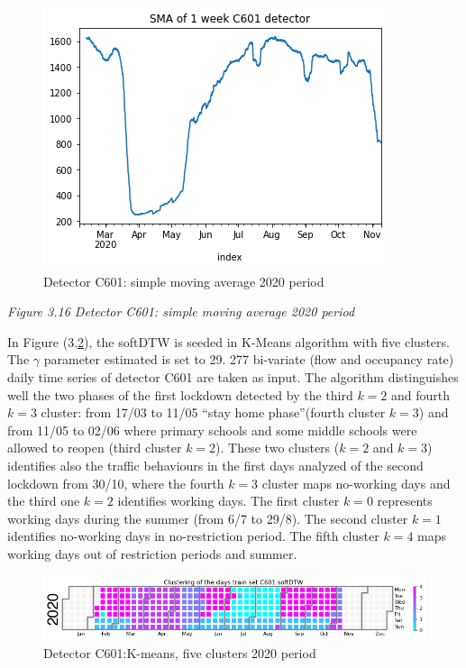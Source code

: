 \documentclass[11pt]{article}
\begin{document}
    \begin{figure}
    \centering
    \includegraphics[scale=0.5]{SMA C601 2020.png}
    \caption{Detector C601: simple moving average 2020 period}
    \label{fig:3.16}
\end{figure}

\emph{\small Figure 3.16 Detector C601: simple moving average 2020 period}

    In Figure (3.\ref{fig:3.17}), the softDTW is seeded in K-Means algorithm
with five clusters. The \(\gamma\) parameter estimated is set to 29. 277
bi-variate (flow and occupancy rate) daily time series of detector C601
are taken as input. The algorithm distinguishes well the two phases of
the first lockdown detected by the third \(k=2\) and fourth \(k=3\)
cluster: from 17/03 to 11/05 ``stay home phase''(fourth cluster \(k=3\))
and from 11/05 to 02/06 where primary schools and some middle schools
were allowed to reopen (third cluster \(k=2\)). These two clusters
(\(k=2\) and \(k=3\)) identifies also the traffic behaviours in the
first days analyzed of the second lockdown from 30/10, where the fourth
\(k=3\) cluster maps no-working days and the third one \(k=2\)
identifies working days. The first cluster \(k=0\) represents working
days during the summer (from 6/7 to 29/8). The second cluster \(k=1\)
identifies no-working days in no-restriction period. The fifth cluster
\(k=4\) maps working days out of restriction periods and summer.

    \begin{figure}
    \centering
    \includegraphics{softDTW K=5 2020.png}
    \caption{Detector C601:K-means, five clusters 2020 period}
    \label{fig:3.17}
\end{figure}
\end{document}
